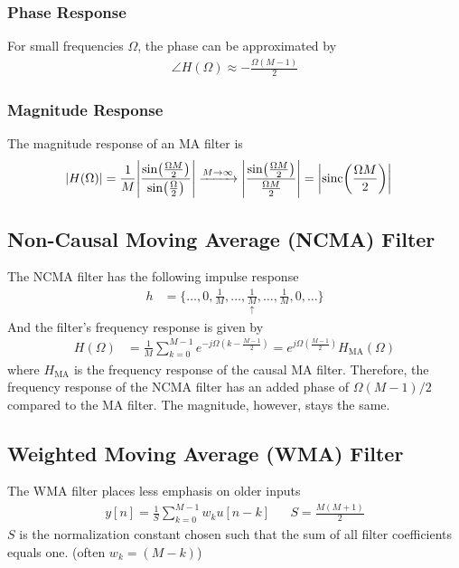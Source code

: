 \subsubsection{Phase Response}
For small frequencies $\Omega$, the phase can be approximated by
\begin{align*}
	\angle H(\Omega) \approx -\frac{\Omega(M-1)}{2}
\end{align*}

\subsubsection{Magnitude Response}
The magnitude response of an MA filter is
\begin{align*}
	\abs{H(\Omega)} &= \frac{1}{M}\abs{\frac{\sin\!\left(\frac{\Omega M}{2}\right)}{\sin\!\left(\frac{\Omega}{2}\right)}} \xrightarrow{M\to\infty}\abs{\frac{\sin\!\left(\frac{\Omega M}{2}\right)}{\frac{\Omega M}{2}}} = \abs{\textrm{sinc}\!\left(\frac{\Omega M}{2}\right)}
\end{align*}

\subsection{Non-Causal Moving Average (NCMA) Filter}
The NCMA filter has the following impulse response
\begin{align*}
	h &= \{ \hdots, 0, \frac{1}{M}, \hdots, \underset{\uparrow}{\frac{1}{M}}, \hdots, \frac{1}{M}, 0, \hdots \}
\end{align*}
And the filter's frequency response is given by
\begin{align*}
	H(\Omega) &= \frac{1}{M}\sum\limits_{k=0}^{M-1}e^{-j\Omega\left(k-\frac{M-1}{2}\right)} = e^{j\Omega\left(\frac{M-1}{2}\right)}H_\text{MA}(\Omega)
\end{align*}
where $H_\text{MA}$ is the frequency response of the causal MA filter. Therefore, the frequency response of the NCMA filter has an added phase of $\Omega(M-1)/2$ compared to the MA filter. The magnitude, however, stays the same.

\subsection{Weighted Moving Average (WMA) Filter}
The WMA filter places less emphasis on older inputs
\begin{align*}
	y[n] = \frac{1}{S}\sum\limits_{k=0}^{M-1}w_ku[n-k] && S = \frac{M(M+1)}{2}
\end{align*}
$S$ is the normalization constant chosen such that the sum of all filter coefficients equals one. (often $w_k = (M-k)$)

